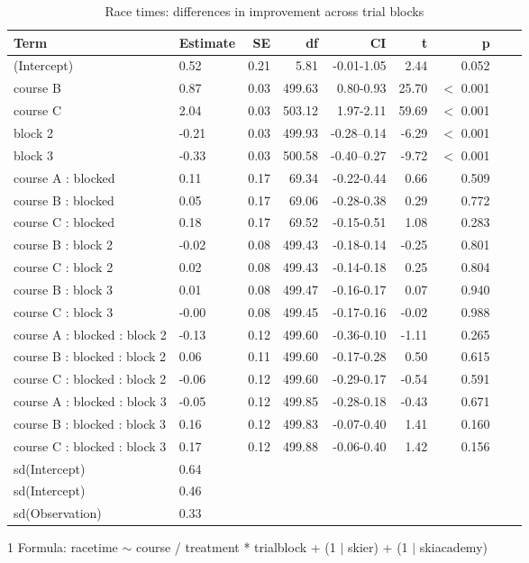 {\begin{table}[ht]
\caption{Race times: differences in improvement across trial blocks}\label{paper1: racetimeinteraction}
\centering
\begin{threeparttable}
\begin{tabular}{llrrrrrrl}
  \hline
Term & Estimate & SE & df & CI & t & p \\ 
  \hline
(Intercept) & 0.52 & 0.21 & 5.81 & -0.01-1.05 & 2.44 &    0.052 \\ 
course B & 0.87 & 0.03 & 499.63 & 0.80-0.93 & 25.70 &  $<$  0.001 \\ 
course C & 2.04 & 0.03 & 503.12 & 1.97-2.11 & 59.69 &  $<$  0.001 \\ 
block 2 & -0.21 & 0.03 & 499.93 & -0.28--0.14 & -6.29 &  $<$  0.001 \\ 
block 3 & -0.33 & 0.03 & 500.58 & -0.40--0.27 & -9.72 &  $<$  0.001 \\ 
course A : blocked & 0.11 & 0.17 & 69.34 & -0.22-0.44 & 0.66 &    0.509 \\ 
course B : blocked & 0.05 & 0.17 & 69.06 & -0.28-0.38 & 0.29 &    0.772 \\ 
course C : blocked & 0.18 & 0.17 & 69.52 & -0.15-0.51 & 1.08 &    0.283 \\ 
course B : block 2 & -0.02 & 0.08 & 499.43 & -0.18-0.14 & -0.25 &    0.801 \\ 
course C : block 2 & 0.02 & 0.08 & 499.43 & -0.14-0.18 & 0.25 &    0.804 \\ 
course B : block 3 & 0.01 & 0.08 & 499.47 & -0.16-0.17 & 0.07 &    0.940 \\ 
course C : block 3 & -0.00 & 0.08 & 499.45 & -0.17-0.16 & -0.02 &    0.988 \\ 
course A : blocked : block 2 & -0.13 & 0.12 & 499.60 & -0.36-0.10 & -1.11 &    0.265 \\ 
course B : blocked : block 2 & 0.06 & 0.11 & 499.60 & -0.17-0.28 & 0.50 &    0.615 \\ 
course C : blocked : block 2 & -0.06 & 0.12 & 499.60 & -0.29-0.17 & -0.54 &    0.591 \\ 
course A : blocked : block 3 & -0.05 & 0.12 & 499.85 & -0.28-0.18 & -0.43 &    0.671 \\ 
course B : blocked : block 3 & 0.16 & 0.12 & 499.83 & -0.07-0.40 & 1.41 &    0.160 \\ 
course C : blocked : block 3 & 0.17 & 0.12 & 499.88 & -0.06-0.40 & 1.42 &    0.156 \\ 
sd(Intercept) & 0.64 &  &  &  &  &   \\ 
sd(Intercept) & 0.46 &  &  &  &  &    \\ 
sd(Observation) & 0.33 &  &  &  &  &    \\ 
   \hline
\end{tabular}
\begin{tablenotes}
\item[1] Formula: racetime $\sim$ course / treatment * trialblock + (1 $|$ skier) + (1 $|$ skiacademy)
\end{tablenotes}
\end{threeparttable}
\end{table}


\clearpage
}

